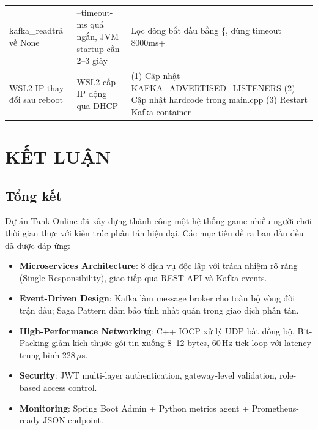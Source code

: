 \documentclass[12pt,a4paper]{report}
\renewcommand{\arraystretch}{1.3}
\begin{document}
\begin{longtable}{%
  >{\RaggedRight\arraybackslash\footnotesize}p{3.8cm}%
  >{\RaggedRight\arraybackslash\footnotesize}p{4.4cm}%
  >{\RaggedRight\arraybackslash\footnotesize}p{6.5cm}}
{\ttfamily kafka\_read}\newline trả về {\ttfamily None} &
  {\ttfamily --timeout-ms} quá ngắn, JVM startup cần 2--3 giây &
  Lọc dòng bắt đầu bằng {\ttfamily \{}, dùng timeout {\ttfamily 8000ms+} \\

WSL2 IP thay đổi sau reboot &
  WSL2 cấp IP động qua DHCP &
  (1) Cập nhật {\ttfamily KAFKA\_ADVERTISED\_LISTENERS}\newline
  (2) Cập nhật hardcode trong {\ttfamily main.cpp}\newline
  (3) Restart Kafka container \\

\end{longtable}
\renewcommand{\arraystretch}{1.3}

\chapter{KẾT LUẬN}

\section{Tổng kết}

Dự án Tank Online đã xây dựng thành công một hệ thống game nhiều người chơi thời gian thực với kiến trúc phân tán hiện đại. Các mục tiêu đề ra ban đầu đều đã được đáp ứng:

\begin{itemize}
  \item \textbf{Microservices Architecture}: 8 dịch vụ độc lập với trách nhiệm rõ ràng (Single Responsibility), giao tiếp qua REST API và Kafka events.
  \item \textbf{Event-Driven Design}: Kafka làm message broker cho toàn bộ vòng đời trận đấu; Saga Pattern đảm bảo tính nhất quán trong giao dịch phân tán.
  \item \textbf{High-Performance Networking}: C++ IOCP xử lý UDP bất đồng bộ, Bit-Packing giảm kích thước gói tin xuống 8--12 bytes, 60\,Hz tick loop với latency trung bình 228\,$\mu$s.
  \item \textbf{Security}: JWT multi-layer authentication, gateway-level validation, role-based access control.
  \item \textbf{Monitoring}: Spring Boot Admin + Python metrics agent + Prometheus-ready JSON endpoint.
\end{itemize}
\end{document}
